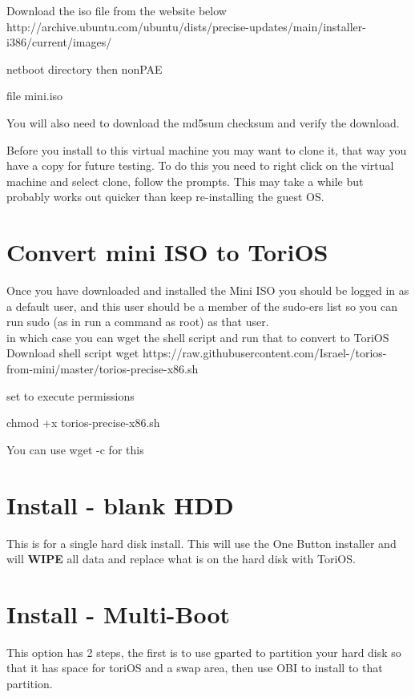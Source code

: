 \documentclass[12pt,a4paper]{book}
\begin{document}
Download the iso file from the website below \\

http://archive.ubuntu.com/ubuntu/dists/precise-updates/main/installer-i386/current/images/

netboot directory then nonPAE

file mini.iso

You will also need to download the md5sum checksum and verify the download. 

Before you install to this virtual machine you may want to clone it, that way you have a copy for future testing. To do this you need to right click on the virtual machine and select clone,  follow the prompts.   This may take a while but probably works out quicker than keep re-installing the guest OS.


\chapter{Convert mini ISO to ToriOS}

Once you have downloaded and installed the Mini ISO you should be logged in as a default user,  and this user should be a member of the sudo-ers list so you can run sudo (as in run a command as root) as that user. \\
in which case you can wget the shell script and run that to convert to ToriOS\\

Download shell script
wget https://raw.githubusercontent.com/Israel-/torios-from-mini/master/torios-precise-x86.sh

set to execute permissions

chmod +x torios-precise-x86.sh


You can use wget -c for this
\chapter{Install - blank HDD}

This is for a single hard disk install.  This will use the One Button installer \cite{OBI} and will \textbf{WIPE} all data and replace what is on the hard disk with ToriOS. 

\chapter{Install - Multi-Boot} 

This option has 2 steps,  the first is to use gparted \cite{Gparted} to partition your hard disk so that it has space for toriOS and a swap area,  then use OBI to install to that partition.  
\end{document}
